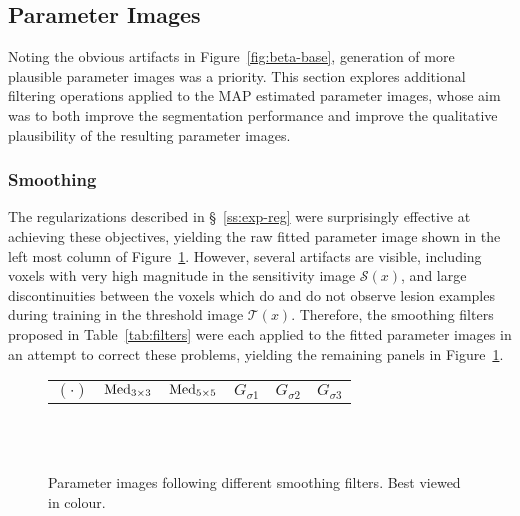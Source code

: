 \subsection{Parameter Images}\label{ss:exp-beta}
Noting the obvious artifacts in Figure~\ref{fig:beta-base},
generation of more plausible parameter images was a priority.
This section explores additional filtering operations applied to the
MAP estimated parameter images, whose aim was to both
improve the segmentation performance
and improve the qualitative plausibility of the resulting parameter images.
\subsubsection{Smoothing}\label{sss:exp-beta-smooth}
The regularizations described in \S~\ref{ss:exp-reg} were surprisingly effective
at achieving these objectives, yielding the raw fitted parameter image
shown in the left most column of Figure~\ref{fig:beta-smooth}.
However, several artifacts are visible, including
voxels with very high magnitude in the sensitivity image $\mathcal{S}(x)$,
and large discontinuities between the voxels which
do and do not observe lesion examples during training in the threshold image $\mathcal{T}(x)$.
Therefore, the smoothing filters proposed in Table~\ref{tab:filters}
were each applied to the fitted parameter images in an attempt to correct these problems,
yielding the remaining panels in Figure~\ref{fig:beta-smooth}.
\par
\begin{figure}
  \centering
  \begin{tabu} to 4.7 %
    $(\cdot)$ & $\mathrm{Med}_{3\times3}$ & $\mathrm{Med}_{5\times5}$ & $G_{\sigma1}$ & $G_{\sigma2}$ & $G_{\sigma3}$
  \end{tabu}%
  \\[0.5em]
  \\[0.5em]
  \caption{Parameter images following different smoothing filters. Best viewed in colour.}%
  \label{fig:beta-smooth}
\end{figure}
